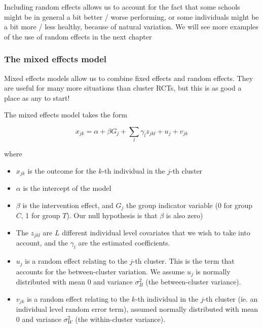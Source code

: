 \documentclass[
  openany]{book}
\providecommand{\tightlist}{%
  \setlength{\itemsep}{0pt}\setlength{\parskip}{0pt}}
\theoremstyle{definition}
\theoremstyle{definition}
\theoremstyle{definition}
\theoremstyle{definition}
\theoremstyle{remark}
\begin{document}
Including random effects allows us to account for the fact that some schools might be in general a bit better / worse performing, or some individuals might be a bit more / less healthy, because of natural variation. We will see more examples of the use of random effects in the next chapter

\subsubsection*{The mixed effects model}\label{the-mixed-effects-model}

Mixed effects models allow us to combine fixed effects and random effects. They are useful for many more situations than cluster RCTs, but this is as good a place as any to start!

The mixed effects model takes the form

\begin{equation}
x_{jk} = \alpha + \beta G_j + \sum\limits_l \gamma_l z_{jkl} + u_{j} + v_{jk}
\label{eq:remodel}
\end{equation}

where

\begin{itemize}
\tightlist
\item
  \(x_{jk}\) is the outcome for the \(k\)-th individual in the \(j\)-th cluster
\item
  \(\alpha\) is the intercept of the model
\item
  \(\beta\) is the intervention effect, and \(G_j\) the group indicator variable (0 for group \(C\), 1 for group \(T\)). Our null hypothesis is that \(\beta\) is also zero)
\item
  The \(z_{jkl}\) are \(L\) different individual level covariates that we wish to take into account, and the \(\gamma_l\) are the estimated coefficients.
\item
  \(u_{j}\) is a random effect relating to the \(j\)-th cluster. This is the term that accounts for the between-cluster variation. We assume \(u_{j}\) is normally distributed with mean 0 and variance \(\sigma^2_B\) (the between-cluster variance).
\item
  \(v_{jk}\) is a random effect relating to the \(k\)-th individual in the \(j\)-th cluster (ie. an individual level random error term), assumed normally distributed with mean 0 and variance \(\sigma^2_W\) (the within-cluster variance).
\end{itemize}
\end{document}

